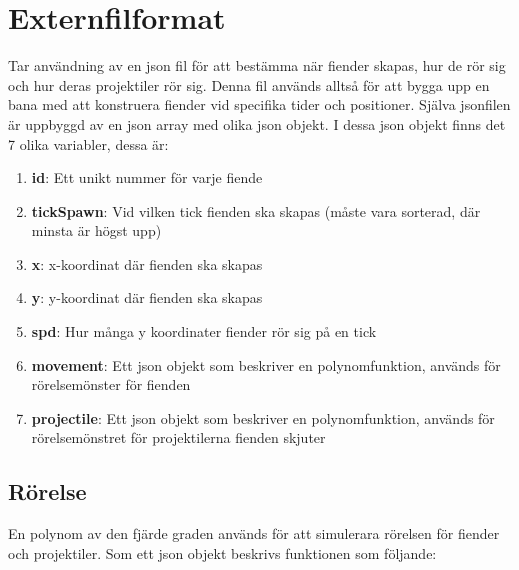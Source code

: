\documentclass{TDP005mall}
\begin{document}
\section{Externfilformat}
Tar användning av en json fil för att bestämma när fiender skapas, hur de rör sig och hur deras projektiler rör sig.
Denna fil används alltså för att bygga upp en bana med att konstruera fiender vid specifika tider och positioner.
Själva jsonfilen är uppbyggd av en json array med olika json objekt. I dessa json objekt finns det 7 olika variabler, dessa är:
\begin{enumerate}
  \item \textbf{id}: Ett unikt nummer för varje fiende
  \item \textbf{tickSpawn}: Vid vilken tick fienden ska skapas (måste vara sorterad, där minsta är högst upp)
  \item \textbf{x}: x-koordinat där fienden ska skapas
  \item \textbf{y}: y-koordinat där fienden ska skapas
  \item \textbf{spd}: Hur många y koordinater fiender rör sig på en tick
  \item \textbf{movement}: Ett json objekt som beskriver en polynomfunktion, används för rörelsemönster för fienden
  \item \textbf{projectile}: Ett json objekt som beskriver en polynomfunktion, används för rörelsemönstret för projektilerna fienden skjuter
\end{enumerate}

\vspace{3cm}

\subsection{Rörelse}
En polynom av den fjärde graden används för att simulerara rörelsen för fiender och projektiler.
Som ett json objekt beskrivs funktionen som följande:\\
\end{document}
